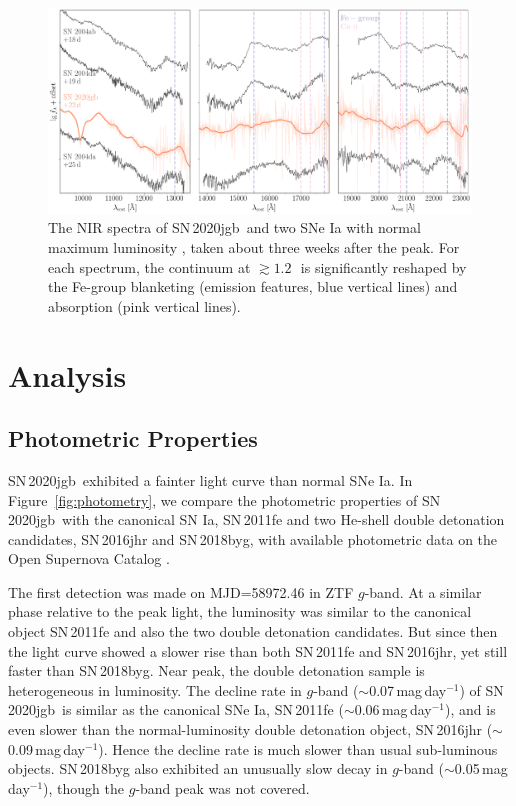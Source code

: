 \documentclass[twocolumn]{aastex631}
\newcommand{\sn}{SN\,2020jgb}
\begin{document}
\begin{figure}
    \centering
    \includegraphics[width=\textwidth]{NIR_spec.pdf}
    \caption{The NIR spectra of \sn\ and two SNe Ia with normal maximum luminosity \citep[SN\,2004ab and SN\,2004da,][]{Marion2009_NIR}, taken about three weeks after the peak. For each spectrum, the continuum at $\gtrsim1.2$\,\micron\ is significantly reshaped by the Fe-group blanketing (emission features, blue vertical lines) and  absorption (pink vertical lines).}
    \label{fig:NIR_spec}
\end{figure}

\section{Analysis} \label{sec:analysis}
\subsection{Photometric Properties}
\sn\ exhibited a fainter light curve than normal SNe Ia. In Figure~\ref{fig:photometry}, we compare the photometric properties of \sn\ with the canonical SN Ia, SN\,2011fe \citep{Nugent_11fe_2011} and two He-shell double detonation candidates, SN\,2016jhr and SN\,2018byg, with available photometric data on the Open Supernova Catalog \citep{Guillochon_2017}.

The first detection was made on MJD=58972.46 in ZTF $g$-band. At a similar phase relative to the peak light, the luminosity was similar to the canonical object SN\,2011fe and also the two double detonation candidates. But since then the light curve showed a slower rise than both SN\,2011fe and SN\,2016jhr, yet still faster than SN\,2018byg. Near peak, the double detonation sample is heterogeneous in luminosity. The decline rate in $g$-band ($\sim$0.07\,mag\,day$^{-1}$) of \sn\ is similar as the canonical SNe Ia, SN\,2011fe ($\sim$0.06\,mag\,day$^{-1}$), and is even slower than the normal-luminosity double detonation object, SN\,2016jhr ($\sim$0.09\,mag\,day$^{-1}$). Hence the decline rate is much slower than usual sub-luminous objects. SN\,2018byg also exhibited an unusually slow decay in $g$-band ($\sim$0.05\,mag\,day$^{-1}$), though the $g$-band peak was not covered.
\end{document}
